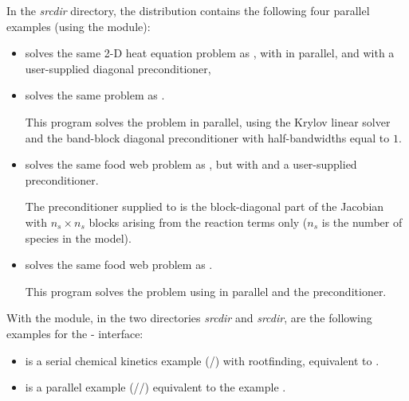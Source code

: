 \vspace{0.2in}\noindent
In the {\em srcdir} directory, the {\ida} 
distribution contains the following four parallel examples 
(using the {\nvecp} module):
\begin{itemize}

\item {}
  solves the same 2-D heat equation problem as , with {\idaspgmr}
  in parallel, and with a user-supplied diagonal preconditioner,
  
\item {}
  solves the same problem as .

  This program solves the problem in parallel, using the Krylov linear solver
  {\idaspgmr} and the band-block diagonal preconditioner {\idabbdpre} with
  half-bandwidths equal to $1$.

\item {}
  solves the same food web problem as , but with {\idaspgmr}
  and a user-supplied preconditioner.
  
  The preconditioner supplied to {\idaspgmr} is the block-diagonal part of 
  the Jacobian with $n_s \times n_s$ blocks arising from the reaction terms only
  ($n_s$ is the number of species in the model).

\item {}
  solves the same food web problem as .

  This program solves the problem using {\idaspgmr} in parallel and the
  {\idabbdpre} preconditioner.

\end{itemize}

\vspace{0.2in}\noindent
With the {\fida} module, in the two directories
{\em srcdir} and
{\em srcdir}, are the following
examples for the {\F}-{\C} interface:
%
\begin{itemize}
\item {} is a serial chemical kinetics example (/{\dense})
       with rootfinding, equivalent to .

\item {} is a parallel example (/{\spgmr}/{\idabbdpre})
       equivalent to the example .

\end{itemize}

